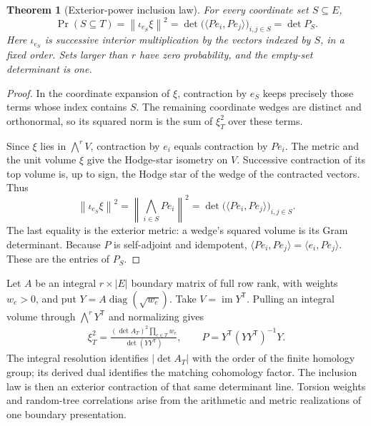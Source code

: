 \documentclass[11pt]{article}
\newtheorem{theorem}{Theorem}[section]
\theoremstyle{definition}
\theoremstyle{remark}
\begin{document}
\begin{theorem}[Exterior-power inclusion law]\label{thm:derived-exterior-law}
For every coordinate set $S\subseteq E$,
\[
 \Pr(S\subseteq T)
 =\left\|\iota_{e_S}\xi\right\|^2
 =\det\bigl(\langle Pe_i,Pe_j\rangle\bigr)_{i,j\in S}
 =\det P_S.
\]
Here $\iota_{e_S}$ is successive interior multiplication by the vectors indexed by $S$, in a fixed order. Sets larger than $r$ have zero probability, and the empty-set determinant is one.
\end{theorem}
\begin{proof}
In the coordinate expansion of $\xi$, contraction by $e_S$ keeps precisely those terms whose index contains $S$. The remaining coordinate wedges are distinct and orthonormal, so its squared norm is the sum of $\xi_T^2$ over these terms.

Since $\xi$ lies in $\bigwedge^rV$, contraction by $e_i$ equals contraction by $Pe_i$. The metric and the unit volume $\xi$ give the Hodge-star isometry on $V$. Successive contraction of its top volume is, up to sign, the Hodge star of the wedge of the contracted vectors. Thus
\[
 \left\|\iota_{e_S}\xi\right\|^2
 =\left\|\bigwedge_{i\in S}Pe_i\right\|^2
 =\det\bigl(\langle Pe_i,Pe_j\rangle\bigr)_{i,j\in S}.
\]
The last equality is the exterior metric: a wedge's squared volume is its Gram determinant. Because $P$ is self-adjoint and idempotent, $\langle Pe_i,Pe_j\rangle=\langle e_i,Pe_j\rangle$. These are the entries of $P_S$.
\end{proof}

Let $A$ be an integral $r\times|E|$ boundary matrix of full row rank, with weights $w_e>0$, and put $Y=A\operatorname{diag}(\sqrt{w_e})$. Take $V=\operatorname{im}Y^{\mathsf T}$. Pulling an integral volume through $\bigwedge^rY^{\mathsf T}$ and normalizing gives
\begin{equation}\label{eq:derived-exterior-coordinates}
 \begin{aligned}
 \xi_T^2=
 \frac{(\det A_T)^2\prod_{e\in T}w_e}
      {\det(YY^{\mathsf T})},\qquad
 P=Y^{\mathsf T}(YY^{\mathsf T})^{-1}Y.
 \end{aligned}
\end{equation}
The integral resolution identifies $|\det A_T|$ with the order of the finite homology group; its derived dual identifies the matching cohomology factor. The inclusion law is then an exterior contraction of that same determinant line. Torsion weights and random-tree correlations arise from the arithmetic and metric realizations of one boundary presentation.
\end{document}
